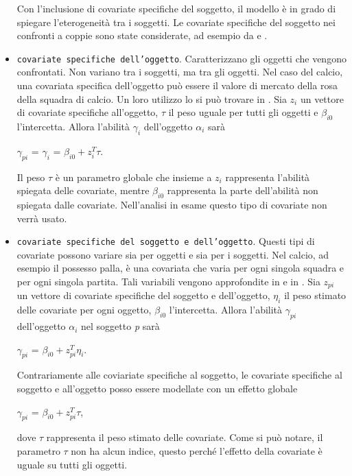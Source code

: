 \begin{itemize}
	Con l'inclusione di covariate specifiche del soggetto, il modello è in grado di spiegare l'eterogeneità tra i soggetti. Le covariate specifiche del soggetto nei confronti a coppie sono state considerate, ad esempio da \textcite{francis2010} e \textcite{Turner2012Firth}.
	\item \texttt{covariate specifiche dell'oggetto}. Caratterizzano gli oggetti che vengono confrontati. Non variano tra i soggetti, ma tra gli oggetti. Nel caso del calcio, una covariata specifica dell'oggetto può essere il valore di mercato della rosa della squadra di calcio. Un loro utilizzo lo si può trovare in \textcite{schauberger2017}.
	Sia $z_{i}$ un vettore di covariate specifiche all'oggetto, $\tau$ il peso uguale per tutti gli oggetti e $\beta_{i0}$ l'intercetta. Allora l'abilità $\gamma_{i}$ dell'oggetto $\alpha_{i}$ sarà
	\begin{center}
		$\gamma_{pi}$ = $ \gamma_{i}$ = $\beta_{i0} + z^{T}_{i}\tau$.
	\end{center}
	Il peso $\tau$ è un parametro globale che insieme a $z_{i}$ rappresenta l'abilità spiegata delle covariate, mentre $\beta_{i0}$ rappresenta la parte dell'abilità non spiegata dalle covariate. Nell'analisi in esame questo tipo di covariate non verrà usato.
	\item \texttt{covariate specifiche del soggetto e dell'oggetto}. Questi tipi di covariate possono variare sia per oggetti e sia per i soggetti. Nel calcio, ad esempio il possesso palla, è una covariata che varia per ogni singola squadra e per ogni singola partita. Tali variabili vengono approfondite in \textcite{thurner2000policy} e in \textcite{mauerer2015modeling}. Sia $z_{pi}$ un vettore di covariate specifiche del soggetto e dell'oggetto, $\eta_i$ il peso stimato delle covariate per ogni oggetto, $\beta_{i0}$ l'intercetta. Allora l'abilità $\gamma_{pi}$ dell'oggetto $\alpha_{i}$ nel soggetto \emph{p} sarà
		\begin{center}
		$ \gamma_{pi}$ = $\beta_{i0} + z^{T}_{pi}\eta_i$.
	\end{center}
	Contrariamente alle coviariate specifiche al soggetto, le covariate specifiche al soggetto e all'oggetto posso essere modellate con un effetto globale
		\begin{center}
			$ \gamma_{pi}$ = $\beta_{i0} + z^{T}_{pi}\tau$,
		\end{center}
	 dove $\tau$ rappresenta il peso stimato delle covariate. Come si può notare, il parametro $\tau$ non ha alcun indice, questo perché l'effetto della covariate è uguale su tutti gli oggetti.
\end{itemize}



